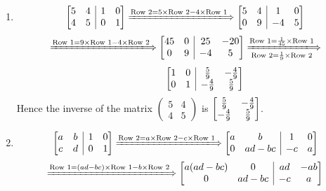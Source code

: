 \begin{enumerate}
\begin{enumerate}
\item
\[
\left[
\begin{array}{@{}cc|cc@{}}
5&4&1&0\\
4&5&0&1
\end{array}
\right]
\xLongrightarrow{\text{Row 2}=5\x\text{Row 2}-4\x\text{Row 1}}
\left[
\begin{array}{@{}cc|cc@{}}
5&4&1&0\\
0&9&-4&5
\end{array}
\right]
\]
\[
\xLongrightarrow{\text{Row 1}=9\x\text{Row 1}-4\x\text{Row 2}}
\left[
\begin{array}{@{}cc|cc@{}}
45&0&25&-20\\
0&9&-4&5
\end{array}
\right]
\xLongrightarrow[\text{Row 2}=\frac{1}{9}\x\text{Row 2}]{\text{Row 1}=\frac{1}{45}\x\text{Row 1}}
\]
\[
\qquad\qquad\left[
\begin{array}{@{}cc|cc@{}}
1&0&\frac{5}{9}&-\frac{4}{9}\\
0&1&-\frac{4}{9}&\frac{5}{9}
\end{array}
\right]
\]
Hence the inverse of the matrix $\begin{pmatrix}
5&4\\4&5
\end{pmatrix}$ is 
$
\left[
\begin{array}{@{}cc@{}}
\frac{5}{9}&-\frac{4}{9}\\
-\frac{4}{9}&\frac{5}{9}
\end{array}
\right]
$.
\item
\[
\left[
\begin{array}{@{}cc|cc@{}}
a&b&1&0\\
c&d&0&1
\end{array}
\right]
\xLongrightarrow{\text{Row 2}=a\x\text{Row 2}-c\x\text{Row 1}}
\left[
\begin{array}{@{}cc|cc@{}}
a&b&1&0\\
0&ad-bc&-c&a
\end{array}
\right]
\]
\[
\xLongrightarrow{\text{Row 1}=(ad-bc)\x\text{Row 1}-b\x\text{Row 2}}
\left[
\begin{array}{@{}cc|cc@{}}
a(ad-bc)&0&ad&-ab\\
0&ad-bc&-c&a
\end{array}
\right]
\]
\end{enumerate}
\end{enumerate}
